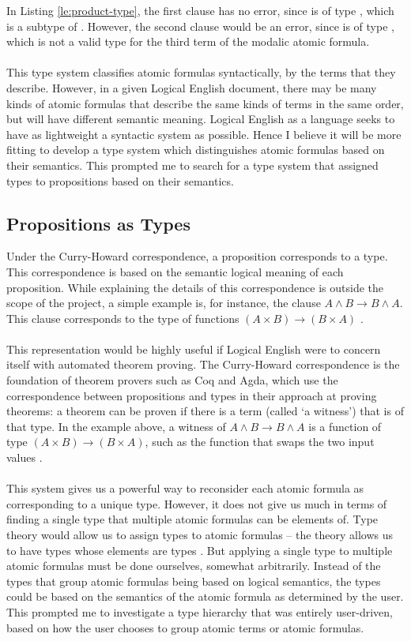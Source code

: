\documentclass[../main.tex]{subfiles}
\begin{document}
In Listing \ref{le:product-type}, the first clause has no error, since  is of type , which is a subtype of . However, the second clause would be an error, since  is of type , which is not a valid type for the third term of the modalic atomic formula.
\\
\\
This type system classifies atomic formulas syntactically, by the terms that they describe. However, in a given Logical English document, there may be many kinds of atomic formulas that describe the same kinds of terms in the same order, but will have different semantic meaning. Logical English as a language seeks to have as lightweight a syntactic system as possible. Hence I believe it will be more fitting to develop a type system which distinguishes atomic formulas based on their semantics. This prompted me to search for a type system that assigned types to propositions based on their semantics.

\subsection{Propositions as Types}
\label{section:props-as-types}
Under the Curry-Howard correspondence, a proposition corresponds to a type. This correspondence is based on the semantic logical meaning of each proposition. While explaining the details of this correspondence is outside the scope of the project, a simple example is, for instance, the clause $A \land B \longrightarrow B \land A$. This clause corresponds to the type of functions $(A \times B) \longrightarrow (B \times A)$ \cite{lambda_calc}.
\\
\\
This representation would be highly useful if Logical English were to concern itself with automated theorem proving. The Curry-Howard correspondence is the foundation of theorem provers such as Coq and Agda, which use the correspondence between propositions and types in their approach at proving theorems: a theorem can be proven if there is a term (called `a witness') that is of that type. In the example above, a witness of $A \land B \longrightarrow B \land A$ is a function of type $(A \times B) \longrightarrow (B \times A)$, such as the function that swaps the two input values \cite{lambda_calc}.
\\
\\
This system gives us a powerful way to reconsider each atomic formula as corresponding to a unique type. However, it does not give us much in terms of finding a single type that multiple atomic formulas can be elements of. Type theory would allow us to assign types to atomic formulas -- the theory allows us to have types whose elements are types \cite[p.~24]{homotopy_type_theory}. But applying a single type to multiple atomic formulas must be done ourselves, somewhat arbitrarily. Instead of the types that group atomic formulas being based on logical semantics, the types could be based on the semantics of the atomic formula as determined by the user. This prompted me to investigate a type hierarchy that was entirely user-driven, based on how the user chooses to group atomic terms or atomic formulas.
\end{document}
